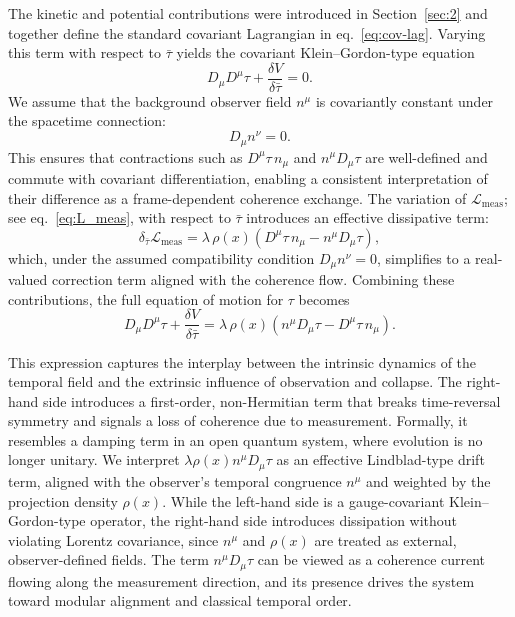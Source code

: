 \documentclass[11pt]{article}
\begin{document}
The kinetic and potential contributions were introduced in Section~\ref{sec:2} and together define the standard covariant Lagrangian in eq.~\eqref{eq:cov-lag}. Varying this term with respect to \( \bar{\tau} \) yields the covariant Klein--Gordon-type equation
\begin{equation}
D_\mu D^\mu \tau + \frac{\delta V}{\delta \bar{\tau}} = 0.
\end{equation}
We assume that the background observer field \( n^\mu \) is covariantly constant under the spacetime connection:
\begin{equation}
D_\mu n^\nu = 0.
\end{equation}
This ensures that contractions such as \( D^\mu \tau \, n_\mu \) and \( n^\mu D_\mu \tau \) are well-defined and commute with covariant differentiation, enabling a consistent interpretation of their difference as a frame-dependent coherence exchange. The variation of \( \mathcal{L}_{\mathrm{meas}} \); see eq.~\eqref{eq:L_meas}, with respect to \( \bar{\tau} \) introduces an effective dissipative term:
\begin{equation}
\delta_{\bar{\tau}} \mathcal{L}_{\mathrm{meas}} = \lambda \, \rho(x) \left( D^\mu \tau \, n_\mu - n^\mu D_\mu \tau \right),
\end{equation}
which, under the assumed compatibility condition \( D_\mu n^\nu = 0 \), simplifies to a real-valued correction term aligned with the coherence flow. Combining these contributions, the full equation of motion for \( \tau \) becomes
\begin{equation}
D_\mu D^\mu \tau + \frac{\delta V}{\delta \bar{\tau}} = \lambda \, \rho(x) \left( n^\mu D_\mu \tau - D^\mu \tau \, n_\mu \right).
\end{equation}

This expression captures the interplay between the intrinsic dynamics of the temporal field and the extrinsic influence of observation and collapse. The right-hand side introduces a first-order, non-Hermitian term that breaks time-reversal symmetry and signals a loss of coherence due to measurement. Formally, it resembles a damping term in an open quantum system, where evolution is no longer unitary. We interpret $\lambda \rho(x) n^\mu D_\mu \tau$ as an effective Lindblad-type drift term, aligned with the observer's temporal congruence $n^\mu$ and weighted by the projection density $\rho(x)$. While the left-hand side is a gauge-covariant Klein--Gordon-type operator, the right-hand side introduces dissipation without violating Lorentz covariance, since $n^\mu$ and $\rho(x)$ are treated as external, observer-defined fields. The term $n^\mu D_\mu \tau$ can be viewed as a coherence current flowing along the measurement direction, and its presence drives the system toward modular alignment and classical temporal order.
\end{document}

